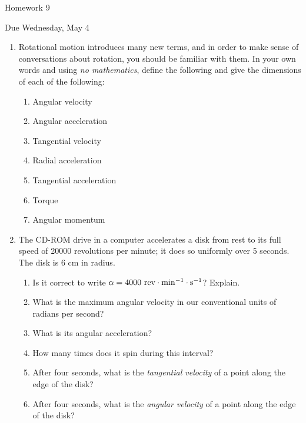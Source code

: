 \documentclass[12pt]{article}
\begin{document}
\begin{center}
	\Large \sc Homework 9
	
	\normalsize Due Wednesday, May 4
\end{center}

\begin{enumerate}
	  \item Rotational motion introduces many new terms, and in order to make sense of conversations about rotation, you should be familiar with them. In your own words and using
	{\it no mathematics}, define the following and give the dimensions of each of the following:
	
	\begin{enumerate}
		\item Angular velocity
		\item Angular acceleration
		\item Tangential velocity
		\item Radial acceleration
		\item Tangential acceleration
		\item Torque
		\item Angular momentum
		
	\end{enumerate}
	\bigskip
	\bigskip
	
	\item  The CD-ROM drive in a computer accelerates a disk from rest to its full speed of 20000 revolutions per minute; it does so uniformly over 5 seconds. The disk is 6 cm in radius.
	
	\begin{enumerate}
		\item Is it correct to write $\alpha = 4000~{\rm rev} \cdot {\rm min}^{-1} \cdot {\rm s}^{-1}$? Explain.
		
		\item What is the maximum angular velocity in our conventional units of radians per second?
		
		\item What is its angular acceleration?
		
		\item How many times does it spin during this interval?
		
		\item After four seconds, what is the {\it tangential velocity} of a point along the edge of the disk?
		
		\item After four seconds, what is the {\it angular velocity} of a point along the edge of the disk?
		

\end{enumerate}
\end{enumerate}
\end{document}
